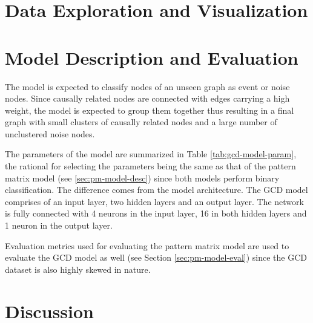 \section{Data Exploration and Visualization}
\label{sec:gcd-data-exp}

\section{Model Description and Evaluation}
\label{sec:gcd-model-desc-eval}

The model is expected to classify nodes of an unseen graph as event or
noise nodes. Since causally related nodes are connected with edges
carrying a high weight, the model is expected to group them together
thus resulting in a final graph with small clusters of causally
related nodes and a large number of unclustered noise nodes.

The parameters of the model are summarized in Table
\ref{tab:gcd-model-param}, the rational for selecting the parameters
being the same as that of the pattern matrix model (see
\ref{sec:pm-model-desc}) since both models perform binary
classification. The difference comes from the model architecture. The
GCD model comprises of an input layer, two hidden layers and an output
layer. The network is fully connected with 4 neurons in the input
layer, 16 in both hidden layers and 1 neuron in the output layer.

Evaluation metrics used for evaluating the pattern matrix model are
used to evaluate the GCD model as well (see Section
\ref{sec:pm-model-eval}) since the GCD dataset is also highly skewed
in nature.

\section{Discussion}
\label{sec[gcd-disc]}





